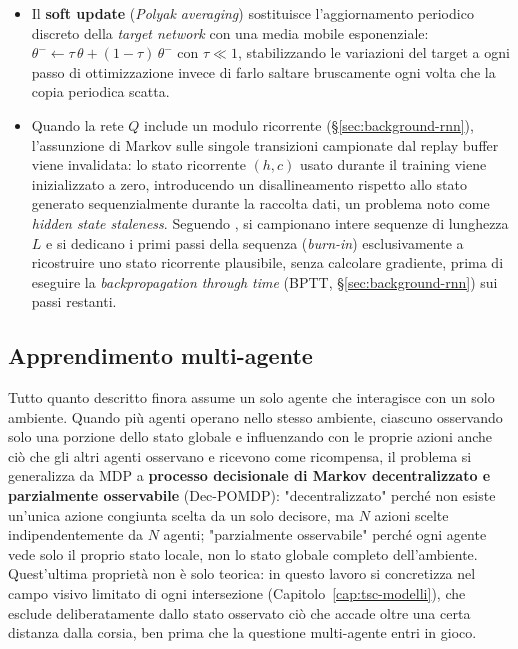 \begin{itemize}
    singolo errore enorme domina il gradiente dell'intero batch; con Huber
    il suo contributo cresce solo linearmente):
    \begin{equation}
      L_\delta(y, \hat y) =
      \begin{cases}
        \tfrac{1}{2}(y-\hat y)^2 & \text{se } |y-\hat y| \le \delta \\
        \delta\left(|y-\hat y| - \tfrac{1}{2}\delta\right) & \text{altrimenti}
      \end{cases}
    \end{equation}
    Tipicamente $\delta = 1$.
  \item Il \textbf{soft update} (\emph{Polyak averaging}) sostituisce
    l'aggiornamento periodico discreto della \emph{target network} con una
    media mobile esponenziale: $\theta^- \leftarrow \tau\,\theta +
    (1-\tau)\,\theta^-$ con $\tau \ll 1$, stabilizzando le variazioni del
    target a ogni passo di ottimizzazione invece di farlo saltare
    bruscamente ogni volta che la copia periodica scatta.
  \item Quando la rete $Q$ include un modulo ricorrente
    (§\ref{sec:background-rnn}), l'assunzione di Markov sulle singole
    transizioni campionate dal replay buffer viene invalidata: lo stato
    ricorrente $(h,c)$ usato durante il training viene inizializzato a
    zero, introducendo un disallineamento rispetto allo stato generato
    sequenzialmente durante la raccolta dati, un problema noto come
    \emph{hidden state staleness}. Seguendo \citet{kapturowski2019r2d2}, si
    campionano intere sequenze di lunghezza $L$ e si dedicano i primi passi
    della sequenza (\emph{burn-in}) esclusivamente a ricostruire uno stato
    ricorrente plausibile, senza calcolare gradiente, prima di eseguire la
    \emph{backpropagation through time} (BPTT, §\ref{sec:background-rnn})
    sui passi restanti.
\end{itemize}

\subsection{Apprendimento multi-agente}
\label{subsec:marl}

Tutto quanto descritto finora assume un solo agente che interagisce con
un solo ambiente. Quando più agenti operano nello stesso ambiente,
ciascuno osservando solo una porzione dello stato globale e influenzando
con le proprie azioni anche ciò che gli altri agenti osservano e
ricevono come ricompensa, il problema si generalizza da MDP a
\textbf{processo decisionale di Markov decentralizzato e parzialmente
osservabile} (Dec-POMDP): "decentralizzato" perché non esiste un'unica
azione congiunta scelta da un solo decisore, ma $N$ azioni scelte
indipendentemente da $N$ agenti; "parzialmente osservabile" perché ogni
agente vede solo il proprio stato locale, non lo stato globale
completo dell'ambiente. Quest'ultima proprietà non è solo teorica: in
questo lavoro si concretizza nel campo visivo limitato di ogni
intersezione (Capitolo~\ref{cap:tsc-modelli}), che esclude deliberatamente
dallo stato osservato ciò che accade oltre una certa distanza dalla
corsia, ben prima che la questione multi-agente entri in gioco.

